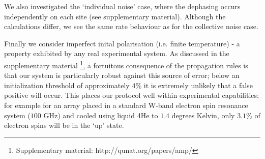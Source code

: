 
        We also investigated the `individual noise' case, where the dephasing occurs independently on each site (see supplementary material). Although the calculations differ, we see the same rate behaviour as for the collective noise case.




Finally we consider imperfect inital polarisation (i.e. finite temperature) - a property exhibited by any real experimental system. As discussed in the supplementary material \footnote{Supplementary material: http://qunat.org/papers/amp/}, a fortuitous consequence of the propagation rules is that our system is particularly robust against this source of error; below an initialization threshold of approximately $4\%$ it is extremely unlikely that a false positive will occur. This places our protocol well within experimental capabilities; for example for an array placed in a standard W-band electron spin resonance system ($100$ GHz) and cooled using liquid 4He to $1.4$ degrees Kelvin, only $3.1\%$ of electron spins will be in the `up' state.

